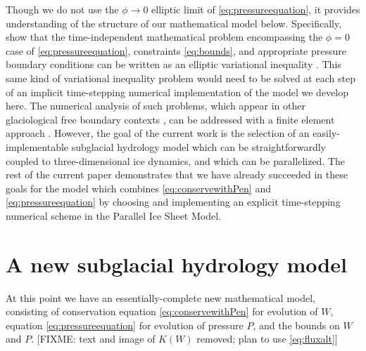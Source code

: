 \documentclass[11pt,final]{amsart}%
\begin{document}
Though we do not use the $\phi\to 0$ elliptic limit of \eqref{eq:pressureequation}, it provides understanding of the structure of our mathematical model below.  Specifically, \cite{Schoofetal2012} show that the time-independent mathematical problem encompassing the $\phi=0$ case of \eqref{eq:pressureequation}, constraints \eqref{eq:bounds}, and appropriate pressure boundary conditions can be written as an elliptic variational inequality \citep{KinderlehrerStampacchia}.  This same kind of variational inequality problem would need to be solved at each step of an implicit time-stepping numerical implementation of the model we develop here.  The numerical analysis of such problems, which appear in other glaciological free boundary contexts \citep{SchoofStream,JouvetBueler2012}, can be addressed with a finite element approach \citep{Ciarlet}.  However, the goal of the current work is the selection of an easily-implementable subglacial hydrology model which can be straightforwardly coupled to three-dimensional ice dynamics, and which can be parallelized.   The rest of the current paper demonstrates that we have already succeeded in these goals for the model which combines \eqref{eq:conservewithPen} and \eqref{eq:pressureequation} by choosing and implementing an explicit time-stepping numerical scheme in the Parallel Ice Sheet Model.


\section{A new subglacial hydrology model}

At this point we have an essentially-complete new mathematical model, consisting of conservation equation \eqref{eq:conservewithPen} for evolution of $W$, equation \eqref{eq:pressureequation} for evolution of pressure $P$, and the bounds on $W$ and $P$.  [FIXME: text and image of $K(W)$ removed; plan to use \eqref{eq:fluxalt}]
\end{document}
